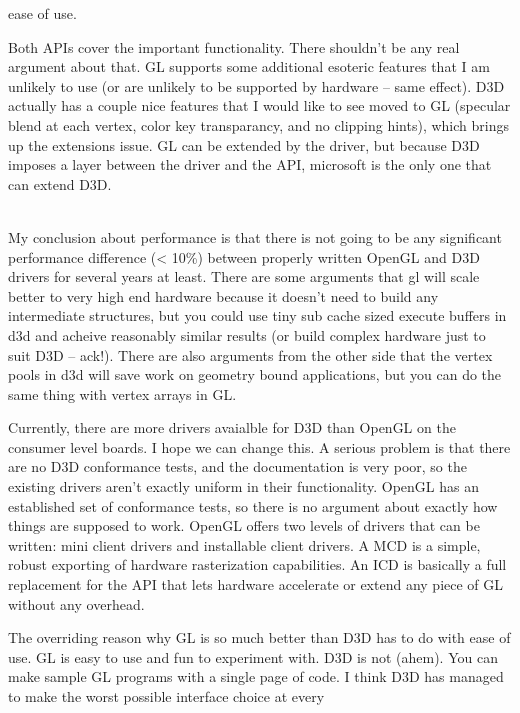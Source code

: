 \begin{allintypewriter}
ease of use.\\ 
\par
Both APIs cover the important functionality. There shouldn't be any real argument about 
that. GL supports some additional esoteric features that I am unlikely to use (or are 
unlikely to be supported by hardware -- same effect). D3D actually has a couple nice 
features that I would like to see moved to GL (specular blend at each vertex, color key 
transparancy, and no clipping hints), which brings up the extensions issue. GL can be 
extended by the driver, but because D3D imposes a layer between the driver and the API, 
microsoft is the only one that can extend D3D.\\ \\ 
\par
My conclusion about performance is that there is not going to be any significant 
performance difference (< 10\%) between properly written OpenGL and D3D drivers for several 
years at least. There are some arguments that gl will scale better to very high end hardware 
because it doesn't need to build any intermediate structures, but you could use tiny sub 
cache sized execute buffers in d3d and acheive reasonably similar results (or build complex 
hardware just to suit D3D -- ack!). There are also arguments from the other side that the 
vertex pools in d3d will save work on geometry bound applications, but you can do the same 
thing with vertex arrays in GL.\\ 
\par
Currently, there are more drivers avaialble for D3D than OpenGL on the consumer level boards. 
I hope we can change this. A serious problem is that there are no D3D conformance tests, and 
the documentation is very poor, so the existing drivers aren't exactly uniform in their 
functionality. OpenGL has an established set of conformance tests, so there is no argument 
about exactly how things are supposed to work. OpenGL offers two levels of drivers that can be 
written: mini client drivers and installable client drivers. A MCD is a simple, robust exporting 
of hardware rasterization capabilities. An ICD is basically a full replacement for the API that 
lets hardware accelerate or extend any piece of GL without any overhead.\\ 
\par
The overriding reason why GL is so much better than D3D has to do with ease of use. GL is easy 
to use and fun to experiment with. D3D is not (ahem). You can make sample GL programs with a 
single page of code. I think D3D has managed to make the worst possible interface choice at every 

\end{allintypewriter}
